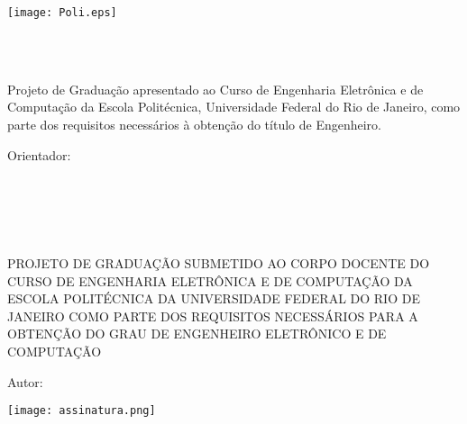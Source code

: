 

\texttt{[image: Poli.eps]}
\vfill

\begin{center}
	\large{\MakeUppercase{\documentTitle}}\\
	\vspace{2cm}
	\large{\myName}\\
\end{center}
\vspace{3cm}
\hspace{7cm}
\hfill \parbox{8.0cm}{Projeto de Graduação apresentado ao Curso de Engenharia Eletrônica e de Computação da Escola Politécnica, Universidade Federal do Rio de Janeiro, como parte dos requisitos necessários à obtenção do título de Engenheiro.\\}
\vspace{2cm}
\hfill \parbox{8.0cm}{Orientador: \orientador} \\
\vspace{2cm}
\begin{center}
	\documentPlace

	\monthyeardate{}

\end{center}




\pagebreak


\begin{center}
	\large{\MakeUppercase{\documentTitle}}\\
	\vspace{1cm}
	\large{\myName}\\
\end{center}
\vspace{2cm}
PROJETO DE GRADUAÇÃO SUBMETIDO AO CORPO DOCENTE DO CURSO DE ENGENHARIA ELETRÔNICA E DE COMPUTAÇÃO DA ESCOLA POLITÉCNICA DA UNIVERSIDADE FEDERAL DO RIO DE JANEIRO COMO PARTE DOS REQUISITOS NECESSÁRIOS PARA A OBTENÇÃO DO GRAU DE ENGENHEIRO ELETRÔNICO E DE COMPUTAÇÃO

\vspace{1cm}
Autor:
\vspace{0.5cm}
\begin{flushright}
    \parbox{10cm}{
        \centering
        \vspace{-1cm} %
        \texttt{[image: assinatura.png]} \\ %
        \vspace{-0.8cm} %
        \hrulefill

        \vspace{-0.375cm} %
        \centering{\myName}
		\vspace{0.1cm}
		}
\end{flushright}


